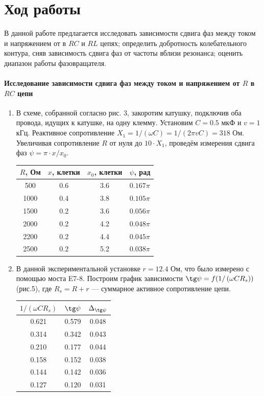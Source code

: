 \documentclass[12pt]{article}
\begin{document}
\section*{Ход работы}
\par
	В данной работе предлагается исследовать зависимости сдвига фаз между током и напряжением от в $RC$ и $RL$ цепях; определить добротность колебательного контура, сняв зависимость сдвига фаз от частоты вблизи резонанса; оценить диапазон работы фазовращателя.	
\paragraph{Исследование зависимости сдвига фаз между током и напряжением от $R$ в $RC$ цепи}
\begin{enumerate}
	\item
		В схеме, собранной согласно рис. 3, закоротим катушку, подключив оба провода, идущих к катушке, на одну клемму. Установим $C = 0.5$ мкФ и $v = 1$ кГц. Реактивное сопротивление $X_1 = 1 / \left(\omega C \right) = 1 / \left(2 \pi v C\right) = 318$ Ом. Увеличивая сопротивление $R$ от нуля до $10 \cdot X_1$, проведём измерения сдвига фаз $\psi = \pi \cdot x / x_0$.
		\begin{table}[h!]
			\centering
			\begin{tabular}{|c|c|c|c|}
			\hline
			$R$, Ом  &  $x$, клетки & $x_0$, клетки & $\psi$, рад \\
 			\hline
 			500 & 0.6 & 3.6 & $0.167 \pi$ \\
 			\hline
 			1000 & 0.4 & 3.8 & $0.105 \pi$ \\
 			\hline
 			1500 & 0.2 & 3.6 & $0.056 \pi$ \\
 			\hline
 			2000 & 0.2 & 4.2 & $0.048 \pi$ \\
 			\hline
 			2200 & 0.2 & 4.4 & $0.045 \pi$ \\ 						
			\hline
			2500 & 0.2 & 5.2 & $0.038 \pi$ \\
			\hline
			\end{tabular}
			\label{table1}
		\end{table}		
	\item
		В данной экспериментальной установке $r=12.4$ Ом, что было измерено с помощью моста E7-8. Построим график зависимости $\tg \psi = f(1 / \left(\omega C 	R_s \right))$ (рис.5), где $R_s = R + r$ --- суммарное активное сопротивление цепи.  
		\begin{table}[h!]
 			\centering
 			\begin{tabular}{|c|c|c|}
 			\hline
 			$1 / \left(\omega C R_s \right)$ & $\tg \psi$ & $\Delta_\text{$\tg \psi$}$ \\
 			\hline
 			0.621 & 0.579 & 0.048\\
 			\hline
 			0.314 & 0.342 & 0.043\\
 			\hline
 			0.210 & 0.177 & 0.044\\
 			\hline
 			0.158 & 0.152 & 0.038\\
 			\hline
 			0.144 & 0.142 & 0.036\\ 			
 			\hline
 			0.127 & 0.120 & 0.031\\ 			 			 			
 			\hline
 			\end{tabular}			
			\label{table2}
		\end{table}
\end{enumerate}		
\end{document}
